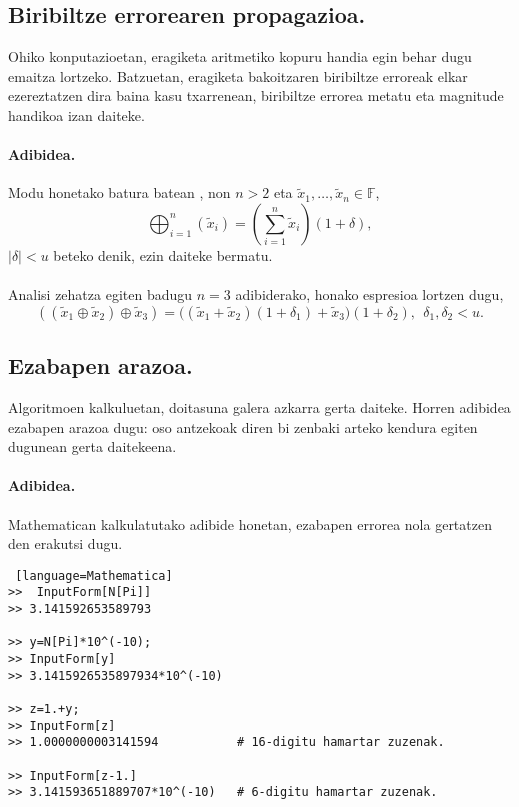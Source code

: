 \subsection*{Biribiltze errorearen propagazioa.}


Ohiko konputazioetan, eragiketa aritmetiko kopuru handia egin behar dugu emaitza lortzeko. Batzuetan, eragiketa bakoitzaren biribiltze erroreak elkar ezereztatzen dira baina kasu txarrenean, biribiltze errorea metatu eta magnitude handikoa izan daiteke.   

\paragraph*{Adibidea.} 
Modu honetako batura batean , non $n>2$ eta $\tilde x_1,\dots,\tilde x_n \in \mathbb{F}$,  
\begin{equation*}
\bigoplus_{i=1}^{n}(\tilde x_i)=(\sum\limits_{i=1}^{n} \tilde x_i)(1+\delta),
\end{equation*}
$|\delta|<u$ beteko denik, ezin daiteke bermatu. 

\paragraph*{}Analisi zehatza egiten badugu $n=3$ adibiderako, honako espresioa lortzen dugu,
\begin{equation*}
((\tilde x_1 \oplus \tilde x_2) \oplus \tilde x_3)  = 
  \big((\tilde x_1 + \tilde x_2)(1+\delta_1)
  +\tilde x_3 \big) (1+\delta_2), \ \ \delta_1,\delta_2<u.
\end{equation*}

\subsection*{Ezabapen arazoa.}

Algoritmoen kalkuluetan, doitasuna galera azkarra gerta daiteke. Horren adibidea ezabapen arazoa dugu: oso antzekoak diren bi zenbaki arteko kendura egiten dugunean gerta daitekeena. 

\paragraph*{Adibidea.} Mathematican kalkulatutako adibide honetan, ezabapen errorea nola gertatzen den erakutsi dugu. 
\begin{lstlisting} [language=Mathematica]
>>  InputForm[N[Pi]]
>> 3.141592653589793

>> y=N[Pi]*10^(-10);
>> InputForm[y]
>> 3.1415926535897934*10^(-10)

>> z=1.+y;
>> InputForm[z]
>> 1.0000000003141594           # 16-digitu hamartar zuzenak.

>> InputForm[z-1.]
>> 3.141593651889707*10^(-10)   # 6-digitu hamartar zuzenak.

\end{lstlisting}


